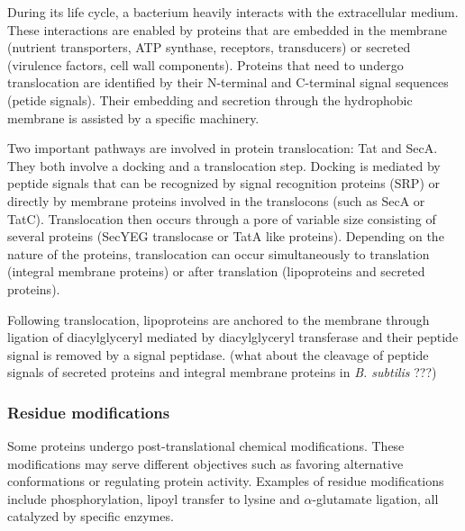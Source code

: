 During its life cycle, a bacterium heavily interacts with the extracellular medium. These interactions are enabled by proteins that are embedded in the membrane (nutrient transporters, ATP synthase, receptors, transducers) or secreted (virulence factors, cell wall components). Proteins that need to undergo translocation are identified by their N-terminal and C-terminal signal sequences (petide signals). Their embedding and secretion through the hydrophobic membrane is assisted by a specific machinery. 

Two important pathways are involved in protein translocation: Tat and SecA. They both involve a docking and a translocation step. Docking is mediated by peptide signals that can be recognized by signal recognition proteins (SRP) or directly by membrane proteins involved in the translocons (such as SecA or TatC). Translocation then occurs through a pore of variable size consisting of several proteins (SecYEG translocase or TatA like proteins). Depending on the nature of the proteins, translocation can occur simultaneously to translation (integral membrane proteins) or after translation (lipoproteins and secreted proteins). 

Following translocation, lipoproteins are anchored to the membrane through ligation of diacylglyceryl mediated by diacylglyceryl transferase and their peptide signal is removed by a signal peptidase. (what about the cleavage of peptide signals of secreted proteins and integral membrane proteins in \textit{B. subtilis} ???)


\subsubsection{Residue modifications}

Some proteins undergo post-translational chemical modifications. These modifications may serve different objectives such as favoring alternative conformations or regulating protein activity. Examples of residue modifications include phosphorylation, lipoyl transfer to lysine and $\alpha$-glutamate ligation, all catalyzed by specific enzymes.
